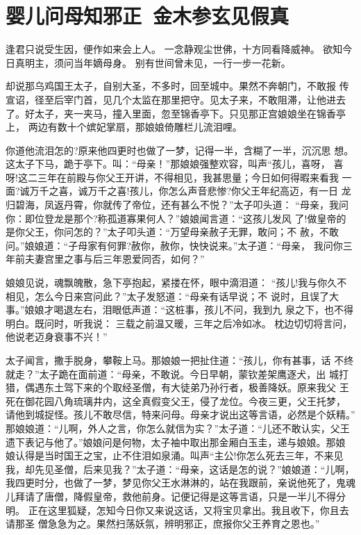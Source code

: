 \chapter{婴儿问母知邪正~金木参玄见假真}

逢君只说受生因，便作如来会上人。
一念静观尘世佛，十方同看降威神。
欲知今日真明主，须问当年嫡母身。
别有世间曾未见，一行一步一花新。

却说那乌鸡国王太子，自别大圣，不多时，回至城中。果然不奔朝门，不敢报
传宣诏，径至后宰门首，见几个太监在那里把守。见太子来，不敢阻滞，让他进去
了。好太子，夹一夹马，撞入里面，忽至锦香亭下。只见那正宫娘娘坐在锦香亭上，
两边有数十个嫔妃掌扇，那娘娘倚雕栏儿流泪哩。

你道他流泪怎的?原来他四更时也做了一梦，记得一半，含糊了一半，沉沉思
想。这太子下马，跪于亭下。叫：“母亲！”那娘娘强整欢容，叫声“孩儿，喜呀，
喜呀!这二三年在前殿与你父王开讲，不得相见，我甚思量；今日如何得暇来看我
一面?诚万千之喜，诚万千之喜!孩儿，你怎么声音悲惨?你父王年纪高迈，有一日
龙归碧海，凤返丹霄，你就传了帝位，还有甚么不悦？”太子叩头道：
“母亲，我问你：即位登龙是那个?称孤道寡果何人？”娘娘闻言道：“这孩儿发风
了!做皇帝的是你父王，你问怎的？”太子叩头道：“万望母亲赦子无罪，敢问；不
赦，不敢问。”娘娘道：“子母家有何罪?赦你，赦你，快快说来。”太子道：“母亲，
我问你三年前夫妻宫里之事与后三年恩爱同否，如何？”

娘娘见说，魂飘魄散，急下亭抱起，紧搂在怀，眼中滴泪道：
“孩儿!我与你久不相见，怎么今日来宫问此？”太子发怒道：“母亲有话早说；不
说时，且误了大事。”娘娘才喝退左右，泪眼低声道：“这桩事，孩儿不问，我到九
泉之下，也不得明白。既问时，听我说：
三载之前温又暖，三年之后冷如冰。
枕边切切将言问，他说老迈身衰事不兴！”

太子闻言，撒手脱身，攀鞍上马。那娘娘一把扯住道：“孩儿，你有甚事，话
不终就走？”太子跪在面前道：“母亲，不敢说。今日早朝，蒙钦差架鹰逐犬，出
城打猎，偶遇东土驾下来的个取经圣僧，有大徒弟乃孙行者，极善降妖。原来我父
王死在御花园八角琉璃井内，这全真假变父王，侵了龙位。今夜三更，父王托梦，
请他到城捉怪。孩儿不敢尽信，特来问母。母亲才说出这等言语，必然是个妖精。”
那娘娘道：“儿啊，外人之言，你怎么就信为实？”太子道：“儿还不敢认实，父王
遗下表记与他了。”娘娘问是何物，太子袖中取出那金厢白玉圭，递与娘娘。那娘
娘认得是当时国王之宝，止不住泪如泉涌。叫声“主公!你怎么死去三年，不来见
我，却先见圣僧，后来见我？”太子道：“母亲，这话是怎的说？”娘娘道：“儿啊，
我四更时分，也做了一梦，梦见你父王水淋淋的，站在我跟前，亲说他死了，鬼魂
儿拜请了唐僧，降假皇帝，救他前身。记便记得是这等言语，只是一半儿不得分明。
正在这里狐疑，怎知今日你又来说这话，又将宝贝拿出。我且收下，你且去请那圣
僧急急为之。果然扫荡妖氛，辨明邪正，庶报你父王养育之恩也。”


